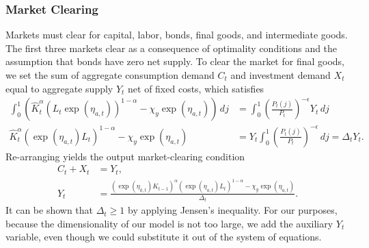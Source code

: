 \documentclass[12 pt, oneside]{article}
\theoremstyle{definition}
\theoremstyle{definition}
\theoremstyle{definition}
\begin{document}
\subsubsection{Market Clearing}
Markets must clear for capital, labor, bonds, final goods, and intermediate goods. The first three markets clear as a consequence of optimality conditions and the assumption that bonds have zero net supply. To clear the market for final goods, we set the sum of aggregate consumption demand $C_t$ and investment demand $X_t$ equal to aggregate supply $Y_t$ net of fixed costs, which satisfies
\begin{align*}
\int_0^1( \hat{K}_t^\alpha (L_t\exp(\eta_{a, t}))^{1 - \alpha} - \chi_y \exp(\eta_{a, t}))\, dj & = \int_0^1\left(\frac{P_t(j)}{P_t}\right)^{-\epsilon} Y_t\, dj\\
  \hat{K}_t^\alpha (\exp(\eta_{a, t})L_t)^{1 - \alpha} - \chi_y\exp(\eta_{a, t}) & = Y_t \int_0^1\left(\frac{P_t(j)}{P_t}\right)^{-\epsilon} \, dj = \Delta_t Y_t.
\end{align*}
Re-arranging yields the output market-clearing condition
\begin{align}\label{eq:output market clearing}
  C_t + X_t & = Y_t,\\
  \label{eq:aggregate supply}
  Y_t & = \frac{(\exp(\eta_{k, t}) K_{t - 1})^{\alpha}(\exp(\eta_{a, t})L_t)^{1 - \alpha} - \chi_y \exp(\eta_{a, t})}{\Delta_t}.
\end{align}
It can be shown that $\Delta_t \geq 1$ by applying Jensen's inequality. For our purposes, because the dimensionality of our model is not too large, we add the auxiliary $Y_t$ variable, even though we could substitute it out of the system of equations.
\end{document}
